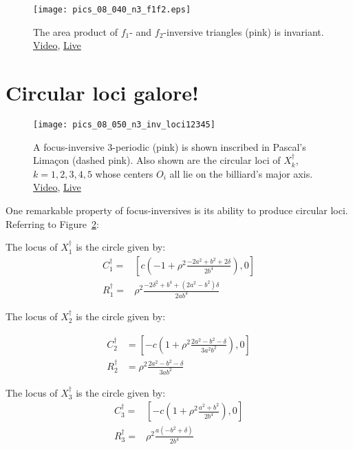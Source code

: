 \begin{figure}
    \centering
    \texttt{[image: pics\_08\_040\_n3\_f1f2.eps]}
    \caption{The area product of $f_1$- and $f_2$-inversive triangles (pink) is invariant. \href{https://youtu.be/0L2uMk2xyKk}{Video}, \href{https://bit.ly/3i1iPCM}{Live}}
    \label{fig:08-inv-pedals}
\end{figure}

\section{Circular loci galore!}

\begin{figure}
    \centering
    \texttt{[image: pics\_08\_050\_n3\_inv\_loci12345]}
    \caption{A focus-inversive 3-periodic (pink) is shown inscribed in Pascal's Limaçon (dashed pink). Also shown are the circular loci of $X_k^\dagger$, $k=1,2,3,4,5$ whose centers $O_i$ all lie on the billiard's major axis. \href{https://youtu.be/OAD2hpCRgCI}{Video}, \href{https://bit.ly/3fW3W1A}{Live}}
    \label{fig:08-n3-loci-12345}
\end{figure}

One remarkable property of focus-inversives is its ability to produce circular loci. Referring to Figure~\ref{fig:08-n3-loci-12345}:

\begin{proposition}
The locus of $X_1^\dagger$ is the circle given by:
\begin{align*}
C_1^\dagger=&\left[c\left(-1+\rho^2\frac{-2a^2+b^2+2\delta}{2b^4}\right), 0\right]\\
R_1^\dagger=&\rho^2\frac{-2\delta^2+b^4+(2a^2-b^2)\delta}{2ab^4}
\end{align*}
\end{proposition}

\begin{proposition}
The locus of $X_2^\dagger$ is the circle given by:

\begin{align*}
C_2^\dagger&=\left[-c\left(1+\rho^2\frac{2a^2-b^2-\delta}{3 a^2 b^2}\right),0\right]\\
R_2^\dagger&=\rho^2\frac{2 a^2-b^2-\delta}{3 a b^2}
\end{align*}
\end{proposition}

\begin{proposition}
The locus of $X_3^\dagger$ is the circle given by:
\begin{align*}
C_3^\dagger=&\left[-c\left(1+\rho^2\frac{a^2+b^2}{2b^4}\right), 0\right]\\
R_3^\dagger=&\rho^2\frac{a(-b^2+\delta)}{2b^4}
\end{align*}
\end{proposition}

